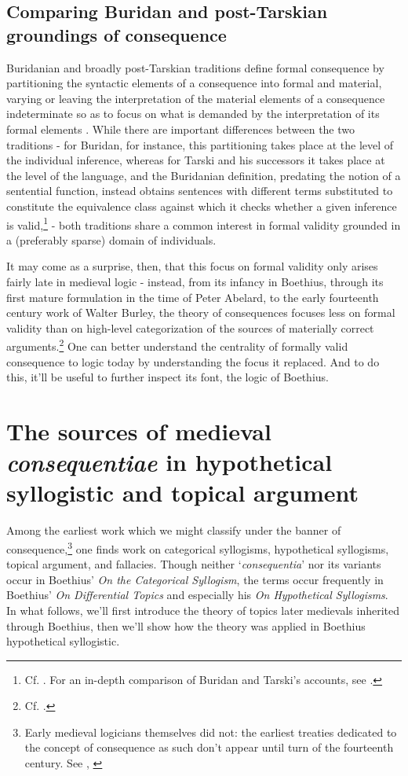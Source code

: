\documentclass[a4paper, 11pt]{article}
\begin{document}
\subsection{Comparing Buridan and post-Tarskian groundings of consequence}
Buridanian and broadly post-Tarskian traditions define formal consequence by partitioning the syntactic elements of a consequence into formal and material, varying or leaving the interpretation of the material elements of a consequence indeterminate so as to focus on what is demanded by the interpretation of its formal elements \autocite[314-321]{DutilhNovaes2011}. While there are important differences between the two traditions - for Buridan, for instance, this partitioning takes place at the level of the individual inference, whereas for Tarski and his successors it takes place at the level of the language, and the Buridanian definition, predating the notion of a sentential function, instead obtains sentences with different terms substituted to constitute the equivalence class against which it checks whether a given inference is valid,\footnote{Cf. \autocite{BarcanMarcus1978}. For an in-depth comparison of Buridan and Tarski's accounts, see \autocite[ch. 2]{Archambault2017d}.}  - both traditions share a common interest in formal validity grounded in a (preferably sparse) domain of individuals. 

It may come as a surprise, then, that this focus on formal validity only arises fairly late in medieval logic - instead, from its infancy in Boethius, through its first mature formulation in the time of Peter Abelard, to the early fourteenth century work of Walter Burley, the theory of consequences focuses less on formal validity than on high-level categorization of the sources of materially correct arguments.\footnote{Cf.  \autocite{Martin2004,Martin2018,Archambault2018a}.} One can better understand the centrality of formally valid consequence to logic today by understanding the focus it replaced. And to do this, it'll be useful to further inspect its font, the logic of Boethius.

\section{The sources of medieval \emph{consequentiae} in hypothetical syllogistic and topical argument}
Among the earliest work which we might classify under the banner of consequence,\footnote{Early medieval logicians themselves did not: the earliest treaties dedicated to the concept of consequence as such don't appear until turn of the fourteenth century. See \autocite{Green-Pedersen1984}, \autocite{Archambault2017d}} one finds work on categorical syllogisms, hypothetical syllogisms, topical argument, and fallacies. Though neither `\emph{consequentia}' nor its variants occur in Boethius' \textit{On the Categorical Syllogism}, the terms occur frequently in Boethius' \emph{On Differential Topics} and especially his \emph{On Hypothetical Syllogisms}. In what follows, we'll first introduce the theory of topics later medievals inherited through Boethius, then we'll show how the theory was applied in Boethius hypothetical syllogistic.
\end{document}
